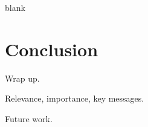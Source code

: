 \begin{savequote}[75mm]
blank
\end{savequote}

\chapter{Conclusion}
\label{conclusion}

Wrap up.

Relevance, importance, key messages.

Future work.
